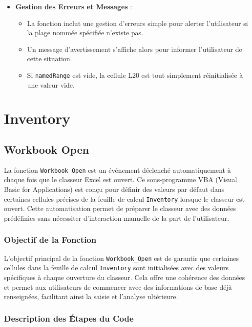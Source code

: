 \documentclass[a4paper, oneside, 12pt, final]{extreport}
\begin{document}
\begin{itemize}
    \item \textbf{Gestion des Erreurs et Messages} :
    \begin{itemize}
        \item La fonction inclut une gestion d'erreurs simple pour alerter l'utilisateur si la plage nommée spécifiée n'existe pas.
        \item Un message d'avertissement s'affiche alors pour informer l'utilisateur de cette situation.
        \item Si \texttt{namedRange} est vide, la cellule L20 est tout simplement réinitialisée à une valeur vide.
    \end{itemize}
\end{itemize}

\section{Inventory}

\subsection{Workbook Open}

La fonction \texttt{Workbook\_Open} est un événement déclenché automatiquement à chaque fois que le classeur Excel est ouvert. Ce sous-programme VBA (Visual Basic for Applications) est conçu pour définir des valeurs par défaut dans certaines cellules précises de la feuille de calcul \texttt{Inventory} lorsque le classeur est ouvert. Cette automatisation permet de préparer le classeur avec des données prédéfinies sans nécessiter d'interaction manuelle de la part de l'utilisateur.

\subsubsection{Objectif de la Fonction}

L'objectif principal de la fonction \texttt{Workbook\_Open} est de garantir que certaines cellules dans la feuille de calcul \texttt{Inventory} sont initialisées avec des valeurs spécifiques à chaque ouverture du classeur. Cela offre une cohérence des données et permet aux utilisateurs de commencer avec des informations de base déjà renseignées, facilitant ainsi la saisie et l'analyse ultérieure.

\subsubsection{Description des Étapes du Code}
\end{document}
